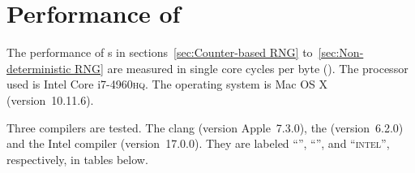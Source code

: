 %
%
%
%

\chapter{Performance of \texorpdfstring{\rng}{RNG}}
\label{chap:Performance of RNG}

The performance of \rng{}s in sections~\ref{sec:Counter-based RNG}
to~\ref{sec:Non-deterministic RNG} are measured in single core cycles per byte
(\cpb). The processor used is Intel Core i7-4960\textsc{hq}. The operating
system is Mac OS X (version~10.11.6).

Three compilers are tested. The \llvm clang (version Apple~7.3.0), the \gnu
\gcc (version~6.2.0) and the Intel \cpp compiler (version~17.0.0). They are
labeled ``\llvm'', ``\gnu'', and ``\textsc{intel}'', respectively, in tables
below.

